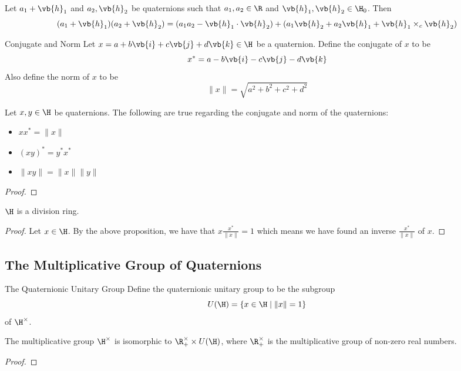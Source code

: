 \documentclass[a4paper]{article}
\begin{document}
\begin{prp}{}{} Let $a_1+\vb{h}_1$ and $a_2,\vb{h}_2$ be quaternions such that $a_1,a_2\in\R$ and $\vb{h}_1,\vb{h}_2\in\H_0$. Then $$(a_1+\vb{h}_1)(a_2+\vb{h}_2)=(a_1a_2-\vb{h}_1\cdot\vb{h}_2)+(a_1\vb{h}_2+a_2\vb{h}_1+\vb{h}_1\times_c\vb{h}_2)$$
\end{prp}

\begin{defn}{Conjugate and Norm}{} Let $x=a+b\vb{i}+c\vb{j}+d\vb{k}\in\H$ be a quaternion. Define the conjugate of $x$ to be $$x^\ast=a-b\vb{i}-c\vb{j}-d\vb{k}$$ Also define the norm of $x$ to be $$\|x\|=\sqrt{a^2+b^2+c^2+d^2}$$
\end{defn}

\begin{prp}{}{} Let $x,y\in\H$ be quaternions. The following are true regarding the conjugate and norm of the quaternions: 
\begin{itemize}
\item $xx^\ast=\|x\|$
\item $(xy)^\ast=y^\ast x^\ast$
\item $\|xy\|=\|x\|\|y\|$
\end{itemize} \tcbline
\begin{proof}

\end{proof}
\end{prp}

\begin{prp}{}{} $\H$ is a division ring. \tcbline
\begin{proof}
Let $x\in\H$. By the above proposition, we have that $x\frac{x^\ast}{\|x\|}=1$ which means we have found an inverse $\frac{x^\ast}{\|x\|}$ of $x$. 
\end{proof}
\end{prp}

\subsection{The Multiplicative Group of Quaternions}
\begin{defn}{The Quaternionic Unitary Group}{} Define the quaternionic unitary group to be the subgroup $$U(\H)=\{x\in\H\;|\;\|x\|=1\}$$ of $\H^\times$. 
\end{defn}

\begin{prp}{}{} The multiplicative group $\H^\times$ is isomorphic to $\R_+^\times\times U(\H)$, where $\R_+^\times$ is the multiplicative group of non-zero real numbers. \tcbline
\begin{proof}

\end{proof}
\end{prp}
\end{document}
